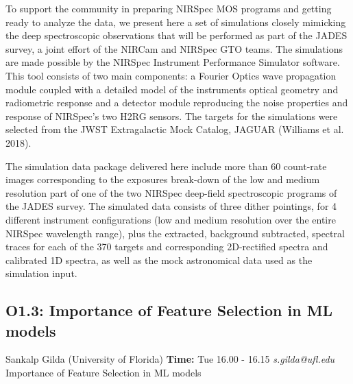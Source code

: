 \documentclass{report}
\begin{document}
To support the community in preparing NIRSpec MOS programs and getting
ready to analyze the data, we present here a set of simulations
closely mimicking the deep spectroscopic observations that will be
performed as part of the JADES survey, a joint effort of the NIRCam
and NIRSpec GTO teams.  The simulations are made possible by the
NIRSpec Instrument Performance Simulator software. This tool consists
of two main components: a Fourier Optics wave propagation module
coupled with a detailed model of the instruments optical geometry and
radiometric response and a detector module reproducing the noise
properties and response of NIRSpec's two H2RG sensors.  The targets
for the simulations were selected from the JWST Extragalactic Mock
Catalog, JAGUAR (Williams et al. 2018).

The simulation data package delivered here include more than 60
count-rate images corresponding to the exposures break-down of the low
and medium resolution part of one of the two NIRSpec deep-field
spectroscopic programs of the JADES survey. The simulated data
consists of three dither pointings, for 4 different instrument
configurations (low and medium resolution over the entire NIRSpec
wavelength range), plus the extracted, background subtracted, spectral
traces for each of the 370 targets and corresponding 2D-rectified
spectra and calibrated 1D spectra, as well as the mock astronomical
data used as the simulation input.\newline
\newpage
\subsection*{O1.3: Importance of Feature Selection in ML models}
\bigskip
Sankalp Gilda (University of Florida) \newline   \newline   \newline   \newline  \newline  \newline\newline
{\bf Time:} Tue 16.00 - 16.15\newline
\newline
{\it s.gilda@ufl.edu}\newline
\newline\newline
Importance of Feature Selection in ML models
\end{document}
